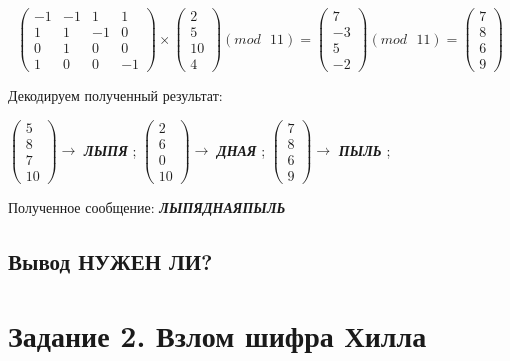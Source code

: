 \documentclass[a5paper, 10pt]{article}
\theoremstyle{definition}
\theoremstyle{plain}
\theoremstyle{remark}
\begin{document}
\begin{equation}
\begin{pmatrix}
-1 & -1 & 1 & 1\\
1 & 1 & -1 & 0 \\
0 & 1 & 0 & 0 \\
1 & 0 & 0 & -1
\end{pmatrix}
 \times
\begin{pmatrix}
2\\
5\\
10\\
4
\end{pmatrix}
(mod \text{ }11)
= 
\begin{pmatrix}
7\\
-3\\
5\\
-2
\end{pmatrix}
(mod \text{ }11)
= \begin{pmatrix}
7\\
8\\
6\\
9
\end{pmatrix}
\end{equation}

Декодируем полученный результат:
\begin{center}
 $ \begin{pmatrix}
5\\
8\\
7\\
10
\end{pmatrix} \to$ \textbf{\textit{ЛЫПЯ}} ;
 $ \begin{pmatrix}
2\\
6\\
0\\
10
\end{pmatrix} \to$ \textbf{\textit{ДНАЯ}} ;
 $ \begin{pmatrix}
7\\
8\\
6\\
9
\end{pmatrix} \to$ \textbf{\textit{ПЫЛЬ}} ;
\end{center}
Полученное сообщение:  \textbf{\textit{\colorbox{red! 50}{ЛЫПЯ}\colorbox{green! 50}{ДНАЯПЫЛЬ}}}\\
\subsection{Вывод НУЖЕН ЛИ?}


\section{Задание 2. Взлом шифра Хилла}	
\end{document}
